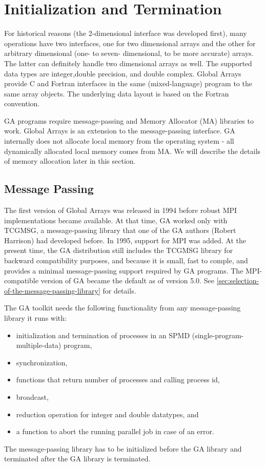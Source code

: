 \chapter{Initialization and Termination}
\label{sec:Initialization-and-Termination}

For historical reasons (the 2-dimensional interface was developed first), many
operations have two interfaces, one for two dimensional arrays and the other
for arbitrary dimensional (one- to seven- dimensional, to be more accurate)
arrays. The latter can definitely handle two dimensional arrays as well. The
supported data types are integer,double precision, and double complex. Global
Arrays provide C and Fortran interfaces in the same (mixed-language) program to
the same array objects. The underlying data layout is based on the Fortran
convention.

GA programs require message-passing and Memory Allocator (MA) libraries to
work. Global Arrays is an extension to the message-passing interface.  GA
internally does not allocate local memory from the operating system - all
dynamically allocated local memory comes from MA. We will describe the details
of memory allocation later in this section. 

\section{Message Passing}

The first version of Global Arrays was released in 1994 before robust MPI
implementations became available. At that time, GA worked only with TCGMSG, a
message-passing library that one of the GA authors (Robert Harrison) had
developed before. In 1995, support for MPI was added. At the present time, the
GA distribution still includes the TCGMSG library for backward compatibility
purposes, and because it is small, fast to comple, and provides a minimal
message-passing support required by GA programs. The MPI-compatible version of
GA became the default as of version 5.0. See
\ref{sec:selection-of-the-message-passing-library} for details.

The GA toolkit needs the following functionality from any message-passing
library it runs with:
\begin{itemize}
\item initialization and termination of processes in an SPMD
(single-program-multiple-data) program, 
\item synchronization, 
\item functions that return number of processes and calling process id, 
\item broadcast, 
\item reduction operation for integer and double datatypes, and 
\item a function to abort the running parallel job in case of an error.
\end{itemize}
The message-passing library has to be initialized before the GA library and
terminated after the GA library is terminated.


